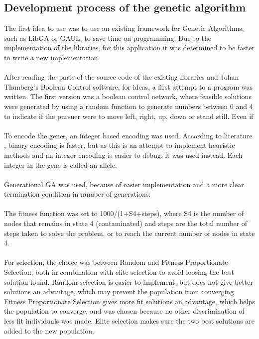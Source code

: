 \subsection{Development process of the genetic algorithm}
The first idea to use  was to use an existing framework for Genetic Algorithms, such as LibGA or GAUL, to save time on programming. Due to the implementation of the libraries, for this application it was determined to be faster to write a new implementation.\\
\\After reading the parts of the source code of the existing libraries and Johan Thunberg's Boolean Control software, for ideas, a first attempt to a program was written. The first version was a boolean control network, where feasible solutions were generated by using a random function to generate numbers between 0 and 4 to indicate if the pursuer were to move left, right, up, down or stand still. Even if \\
\\To encode the genes, an integer based encoding was used. According to literature \cite{GAHandbook1}, binary encoding is faster, but as this is an attempt to implement heuristic methods and an integer encoding is easier to debug, it was used instead. Each integer in the gene is called an allele.\\
\\Generational GA was used, because of easier implementation and a more clear termination condition in number of generations.\\
\\The fitness function was set to 1000/(1+S4+steps), where S4 is the number of nodes that remains in state 4 (contaminated) and steps are the total number of steps taken to solve the problem, or to reach the current number of nodes in state 4.\\
\\For selection, the choice was between Random and Fitness Proportionate Selection, both in combination with elite selection to avoid loosing the best solution found. Random selection is easier to implement, but does not give better solutions an advantage, which may prevent the population from converging. Fitness Proportionate Selection gives more fit solutions an advantage, which helps the population to converge, and was chosen because no other discrimination of less fit individuals was made. Elite selection makes sure the two best solutions are added to the new population.\\
